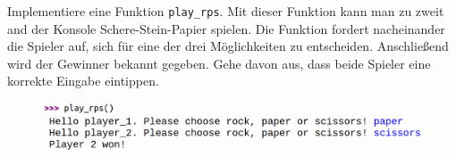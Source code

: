 \documentclass[class=scrartcl, crop=false]{standalone}
\begin{document}
\begin{aufgabe} \noindent
Implementiere eine Funktion \texttt{play_rps}. Mit dieser Funktion kann man zu zweit and der Konsole Schere-Stein-Papier spielen. Die Funktion fordert nacheinander die Spieler auf, sich für eine der drei Möglichkeiten zu entscheiden. Anschließend wird der Gewinner bekannt gegeben. Gehe davon aus, dass beide Spieler eine korrekte Eingabe eintippen.

\begin{figure}[H]
\centering	
\includegraphics[width=\linewidth]{rps}
\end{figure}
\end{aufgabe}







%
%	
%	





\end{document}
